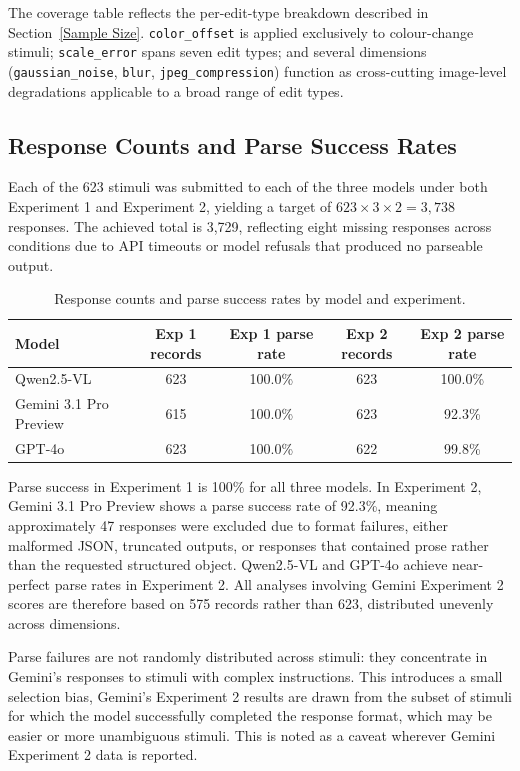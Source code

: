 The coverage table reflects the per-edit-type breakdown described in Section~\ref{Sample Size}. \texttt{color\_offset} is applied exclusively to colour-change stimuli; \texttt{scale\_error} spans seven edit types; and several dimensions (\texttt{gaussian\_noise}, \texttt{blur}, \texttt{jpeg\_compression}) function as cross-cutting image-level degradations applicable to a broad range of edit types.

\subsection{Response Counts and Parse Success Rates}

Each of the 623 stimuli was submitted to each of the three models under both Experiment 1 and Experiment 2, yielding a target of $623 \times 3 \times 2 = 3{,}738$ responses. The achieved total is 3,729, reflecting eight missing responses across conditions due to API timeouts or model refusals that produced no parseable output.

\begin{table}[htbp]
\centering
\caption{Response counts and parse success rates by model and experiment.}
\label{tab:parse-rates}
\begin{tabular}{lcccc}
\toprule
Model & Exp 1 records & Exp 1 parse rate & Exp 2 records & Exp 2 parse rate \\
\midrule
Qwen2.5-VL              & 623 & 100.0\% & 623 & 100.0\% \\
Gemini 3.1 Pro Preview  & 615 & 100.0\% & 623 &  92.3\% \\
GPT-4o                  & 623 & 100.0\% & 622 &  99.8\% \\
\bottomrule
\end{tabular}
\end{table}

Parse success in Experiment 1 is 100\% for all three models. In Experiment 2, Gemini 3.1 Pro Preview shows a parse success rate of 92.3\%, meaning approximately 47 responses were excluded due to format failures, either malformed JSON, truncated outputs, or responses that contained prose rather than the requested structured object. Qwen2.5-VL and GPT-4o achieve near-perfect parse rates in Experiment 2. All analyses involving Gemini Experiment 2 scores are therefore based on 575 records rather than 623, distributed unevenly across dimensions.

Parse failures are not randomly distributed across stimuli: they concentrate in Gemini's responses to stimuli with complex instructions. This introduces a small selection bias, Gemini's Experiment 2 results are drawn from the subset of stimuli for which the model successfully completed the response format, which may be easier or more unambiguous stimuli. This is noted as a caveat wherever Gemini Experiment 2 data is reported.

